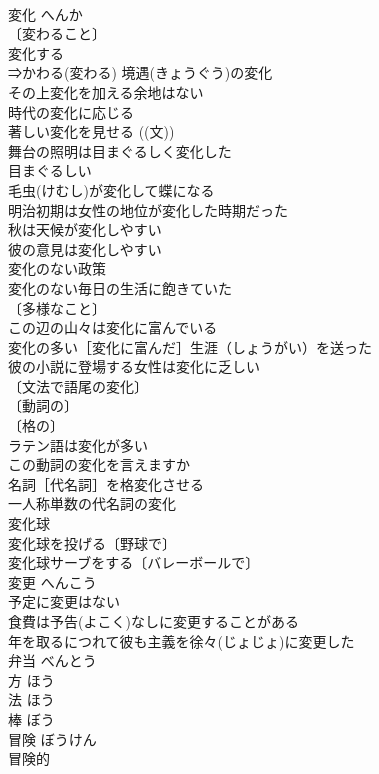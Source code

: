 \documentclass[8pt]{extreport}
\begin{document}
\begin{CJK}{UTF8}{min}
\\	変化	へんか	
\\	〔変わること〕
\\	変化する 
\\	⇒かわる(変わる) 境遇(きょうぐう)の変化 
\\	その上変化を加える余地はない 
\\	時代の変化に応じる 
\\	著しい変化を見せる ((文)) 
\\	舞台の照明は目まぐるしく変化した 
\\	目まぐるしい 
\\	毛虫(けむし)が変化して蝶になる 
\\	明治初期は女性の地位が変化した時期だった 
\\	秋は天候が変化しやすい 
\\	彼の意見は変化しやすい 
\\	変化のない政策 
\\	変化のない毎日の生活に飽きていた 
\\	〔多様なこと〕 
\\	この辺の山々は変化に富んでいる 
\\	変化の多い［変化に富んだ］生涯（しょうがい）を送った 
\\	彼の小説に登場する女性は変化に乏しい 
\\	〔文法で語尾の変化〕
\\	〔動詞の〕
\\	〔格の〕
\\	ラテン語は変化が多い 
\\	この動詞の変化を言えますか 
\\	名詞［代名詞］を格変化させる 
\\	一人称単数の代名詞の変化 
\\	変化球　
\\	変化球を投げる〔野球で〕 
\\	変化球サーブをする〔バレーボールで〕 
\\	変更	へんこう	
\\	予定に変更はない 
\\	食費は予告(よこく)なしに変更することがある 
\\	年を取るにつれて彼も主義を徐々(じょじょ)に変更した 
\\	弁当	べんとう	
\\	方	ほう	
\\	法	ほう	
\\	棒	ぼう	
\\	冒険	ぼうけん	
\\	冒険的 

\end{CJK}
\end{document}
